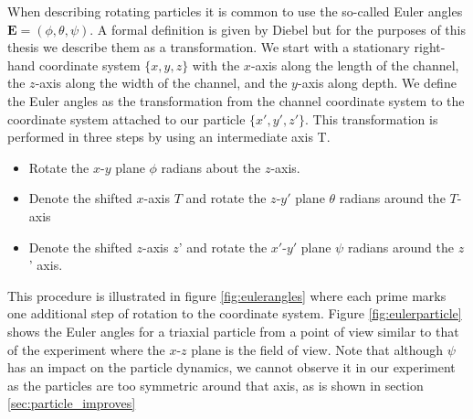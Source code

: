 When describing rotating particles it is common to use the so-called Euler angles $\mathbf{E} = (\phi, \theta, \psi)$. A formal definition is given by Diebel \cite{Euler} but for the purposes of this thesis we describe them as a transformation. We start with a stationary right-hand coordinate system $\{x,y,z\}$ with the $x$-axis along the length of the channel, the $z$-axis along the width of the channel, and the $y$-axis along depth. We define the Euler angles as the transformation from the channel coordinate system to the coordinate system attached to our particle $\{x',y',z'\}$. This transformation is performed in three steps by using an intermediate axis T.

\begin{itemize}
\item Rotate the $x$-$y$ plane $\phi$ radians about the $z$-axis. 
\item Denote the shifted $x$-axis $T$ and rotate the $z$-$y'$ plane $\theta$ radians around the $T$-axis
\item Denote the shifted $z$-axis $z$' and rotate the $x'$-$y'$ plane $\psi$ radians around the $z$' axis.
\end{itemize}

This procedure is illustrated in figure \ref{fig:eulerangles} where each prime marks one additional step of rotation to the coordinate system. Figure \ref{fig:eulerparticle} shows the Euler angles for a triaxial particle from a point of view similar to that of the experiment where the $x$-$z$ plane is the field of view. Note that although $\psi$ has an impact on the particle dynamics, we cannot observe it in our experiment as the particles are too symmetric around that axis, as is shown in section \ref{sec:particle_improves}


